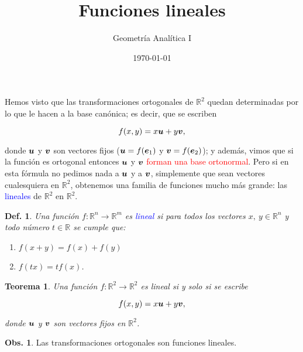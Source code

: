 \documentclass{article}
\title{\Huge{Funciones lineales}}
\author{Geometría Analítica I}
\date{\today}
\theoremstyle{definicion}
\newtheorem{definicion}{Def.}
\theoremstyle{definition}             %
\theoremstyle{definition}             %
\theoremstyle{definition}
\theoremstyle{definition}
\theoremstyle{observacion}
\newtheorem{obs}{Obs.}
\theoremstyle{definition}
\theoremstyle{plain}
\newtheorem{theorem}{Teorema}
\theoremstyle{definition}
\theoremstyle{afirmacion}
\theoremstyle{definition}
\begin{document}
    \maketitle

    Hemos visto que las transformaciones ortogonales de \(\mathbb{R}^{2}\) quedan determinadas por lo que le hacen a la base canónica; es decir, que se escriben

    \begin{equation*}
        f(x, y) = x\vb*{u} + y\vb*{v},
    \end{equation*}

    donde \(\vb*{u}\) y \(\vb*{v}\) son vectores fijos (\(\vb*{u} = f(\vb*{e}_{1})\) y \(\vb*{v} = f(\vb*{e}_{2})\)); y además, vimos que si la función es ortogonal entonces \(\vb*{u}\) y \(\vb*{v}\) \textcolor{red}{forman una base ortonormal}. Pero si en esta fórmula no pedimos nada a \(\vb*{u}\) y a \(\vb*{v}\), simplemente que sean vectores cualesquiera en \(\mathbb{R}^{2}\), obtenemos una familia de funciones mucho más grande: las \textcolor{blue}{lineales} de \(\mathbb{R}^{2}\) en \(\mathbb{R}^{2}\).

    \begin{definicion}
        Una función \(f \colon \mathbb{R}^{n} \to \mathbb{R}^{m}\) es \textcolor{blue}{lineal} si para todos los vectores \(x,\ y\in \mathbb{R}^{n}\) y todo número \(t\in\mathbb{R}\) se cumple que:

        \begin{enumerate}[label = \Roman*)]
            \item \(f(x + y) = f(x) + f(y)\)
            \item \(f(tx) = tf(x)\).
        \end{enumerate}
    \end{definicion}

    \begin{theorem}
        Una función \(f \colon \mathbb{R}^{2} \to \mathbb{R}^{2}\) es lineal si y solo si se escribe

        \begin{equation*}
            f(x, y) = x\vb*{u} + y\vb*{v},
        \end{equation*}

        donde \(\vb*{u}\) y \(\vb*{v}\) son vectores fijos en \(\mathbb{R}^{2}\).
    \end{theorem}

    \begin{obs}
        Las transformaciones ortogonales son funciones lineales.
    \end{obs}
\end{document}
